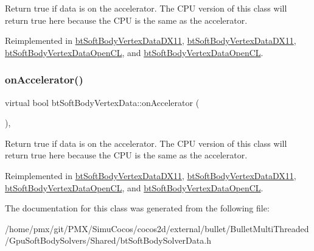 Return true if data is on the accelerator. The C\+PU version of this class will return true here because the C\+PU is the same as the accelerator. 

Reimplemented in \hyperlink{classbtSoftBodyVertexDataDX11_a735a87a0a4acc856b2f656bf684852e4}{bt\+Soft\+Body\+Vertex\+Data\+D\+X11}, \hyperlink{classbtSoftBodyVertexDataDX11_a60f9399bc7a7d652a55e7f1f2140f2b3}{bt\+Soft\+Body\+Vertex\+Data\+D\+X11}, \hyperlink{classbtSoftBodyVertexDataOpenCL_a0277617dbd360ea14ec7848f85b69f4c}{bt\+Soft\+Body\+Vertex\+Data\+Open\+CL}, and \hyperlink{classbtSoftBodyVertexDataOpenCL_addc1f56a6841561023f4bd48ab2f6dd9}{bt\+Soft\+Body\+Vertex\+Data\+Open\+CL}.

\mbox{\label{classbtSoftBodyVertexData_a6512d196039f6445489a093ad18f7764}} 
\subsubsection{\texorpdfstring{on\+Accelerator()}{onAccelerator()}\hspace{0.1cm}{\footnotesize\ttfamily [2/2]}}
{\footnotesize\ttfamily virtual bool bt\+Soft\+Body\+Vertex\+Data\+::on\+Accelerator (\begin{DoxyParamCaption}{ }\end{DoxyParamCaption})\hspace{0.3cm}{\ttfamily [inline]}, {\ttfamily [virtual]}}

Return true if data is on the accelerator. The C\+PU version of this class will return true here because the C\+PU is the same as the accelerator. 

Reimplemented in \hyperlink{classbtSoftBodyVertexDataDX11_a735a87a0a4acc856b2f656bf684852e4}{bt\+Soft\+Body\+Vertex\+Data\+D\+X11}, \hyperlink{classbtSoftBodyVertexDataDX11_a60f9399bc7a7d652a55e7f1f2140f2b3}{bt\+Soft\+Body\+Vertex\+Data\+D\+X11}, \hyperlink{classbtSoftBodyVertexDataOpenCL_a0277617dbd360ea14ec7848f85b69f4c}{bt\+Soft\+Body\+Vertex\+Data\+Open\+CL}, and \hyperlink{classbtSoftBodyVertexDataOpenCL_addc1f56a6841561023f4bd48ab2f6dd9}{bt\+Soft\+Body\+Vertex\+Data\+Open\+CL}.



The documentation for this class was generated from the following file\+:\begin{DoxyCompactItemize}
\item 
/home/pmx/git/\+P\+M\+X/\+Simu\+Cocos/cocos2d/external/bullet/\+Bullet\+Multi\+Threaded/\+Gpu\+Soft\+Body\+Solvers/\+Shared/bt\+Soft\+Body\+Solver\+Data.\+h\end{DoxyCompactItemize}
